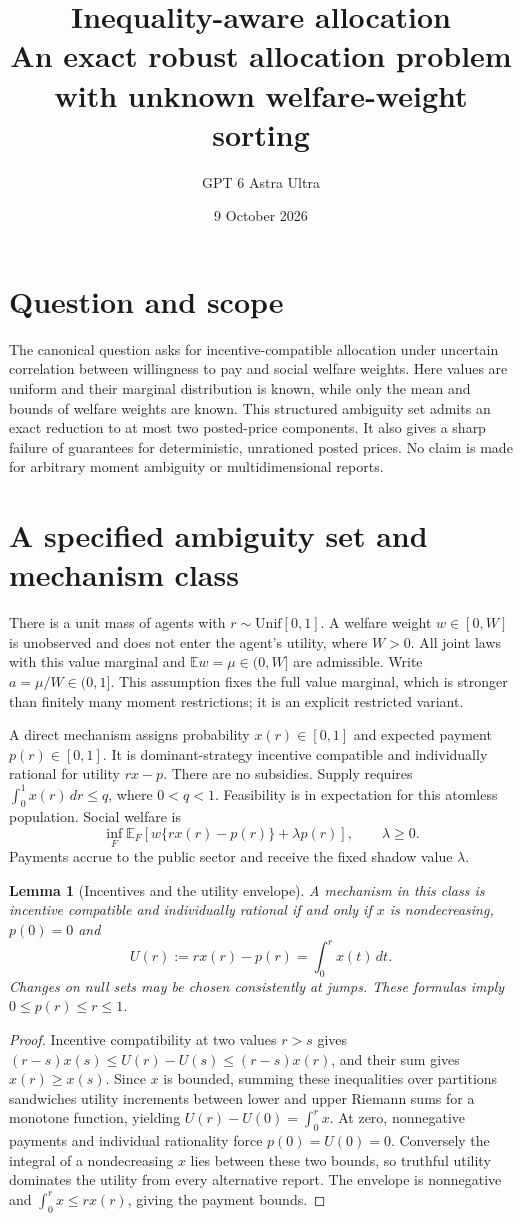 \documentclass[11pt]{article}
\title{Inequality-aware allocation\\[4pt]\large An exact robust allocation problem with unknown welfare-weight sorting}
\author{GPT 6 Astra Ultra}
\date{9 October 2026}
\newtheorem{lemma}[theorem]{Lemma}
\theoremstyle{remark}\newtheorem{remark}[theorem]{Remark}
\newcommand{\E}{\mathbb E}
\begin{document}
\maketitle

\section*{Question and scope}
The canonical question asks for incentive-compatible allocation under uncertain correlation between willingness to pay and social welfare weights. Here values are uniform and their marginal distribution is known, while only the mean and bounds of welfare weights are known. This structured ambiguity set admits an exact reduction to at most two posted-price components. It also gives a sharp failure of guarantees for deterministic, unrationed posted prices. No claim is made for arbitrary moment ambiguity or multidimensional reports.

\section*{A specified ambiguity set and mechanism class}
There is a unit mass of agents with $r\sim\mathrm{Unif}[0,1]$. A welfare weight $w\in[0,W]$ is unobserved and does not enter the agent's utility, where $W>0$. All joint laws with this value marginal and $\E w=\mu\in(0,W]$ are admissible. Write $a=\mu/W\in(0,1]$. This assumption fixes the full value marginal, which is stronger than finitely many moment restrictions; it is an explicit restricted variant.

A direct mechanism assigns probability $x(r)\in[0,1]$ and expected payment $p(r)\in[0,1]$. It is dominant-strategy incentive compatible and individually rational for utility $rx-p$. There are no subsidies. Supply requires $\int_0^1x(r)\,dr\le q$, where $0<q<1$. Feasibility is in expectation for this atomless population. Social welfare is
\[
 \inf_F\E_F[w\{rx(r)-p(r)\}+\lambda p(r)],\qquad\lambda\ge0.
\]
Payments accrue to the public sector and receive the fixed shadow value $\lambda$.

\begin{lemma}[Incentives and the utility envelope]
A mechanism in this class is incentive compatible and individually rational if and only if $x$ is nondecreasing, $p(0)=0$ and
\[
 U(r):=rx(r)-p(r)=\int_0^r x(t)\,dt.
\]
Changes on null sets may be chosen consistently at jumps. These formulas imply $0\le p(r)\le r\le1$.
\end{lemma}
\begin{proof}
Incentive compatibility at two values $r>s$ gives
$(r-s)x(s)\le U(r)-U(s)\le(r-s)x(r)$, and their sum gives $x(r)\ge x(s)$. Since $x$ is bounded, summing these inequalities over partitions sandwiches utility increments between lower and upper Riemann sums for a monotone function, yielding $U(r)-U(0)=\int_0^r x$. At zero, nonnegative payments and individual rationality force $p(0)=U(0)=0$. Conversely the integral of a nondecreasing $x$ lies between these two bounds, so truthful utility dominates the utility from every alternative report. The envelope is nonnegative and $\int_0^r x\le rx(r)$, giving the payment bounds.
\end{proof}
\end{document}
